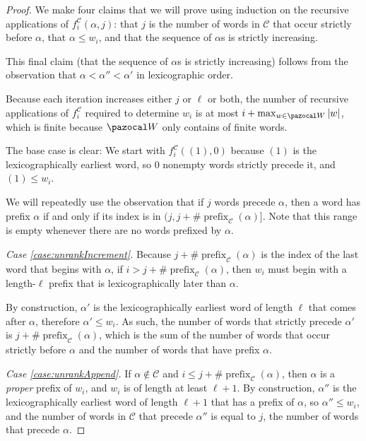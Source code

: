 \begin{proof}
  We make four claims that we will prove using
  induction on the recursive applications of $f_i^\mathcal{C}(\alpha, j)$:
  that $j$ is the number of words in $\mathcal{C}$ that occur strictly before $\alpha$,
  that $\alpha \leq w_i$,
  and that the sequence of $\alpha$s is strictly increasing.

  This final claim (that the sequence of $\alpha$s is strictly increasing)
  follows from the observation that ${\alpha < \alpha'' < \alpha'}$ in
  lexicographic order.

  Because each iteration increases either $j$ or $\ell$ or both,
  the number of recursive applications of $f_i^\mathcal{C}$ required to
  determine $w_i$ is at most $i + \max_{w \in \pazocal W} |w|$, which is
  finite because $\pazocal W$ only contains of finite words.

  The base case is clear: We start with $f_i^\mathcal{C}((1), 0)$ because
  $(1)$ is the lexicographically earliest word, so $0$ nonempty words strictly
  precede it, and $(1) \leq w_i$.

  We will repeatedly use the observation that if $j$ words precede $\alpha$,
  then a word has prefix $\alpha$ if and only if its index is in
  $(j, j + \#\operatorname{prefix}_\mathcal{C}(\alpha)]$. Note that this
  range is empty whenever there are no words prefixed by $\alpha$.

  \textit{Case \eqref{case:unrankIncrement}.}
  Because $j + \#\operatorname{prefix}_\mathcal{C}(\alpha)$ is the index
  of the last word that begins with $\alpha$,
  if $i > j + \#\operatorname{prefix}_\mathcal{C}(\alpha)$, then $w_i$ must
  begin with a length-$\ell$ prefix that is lexicographically later than $\alpha$.

  By construction, $\alpha'$ is the lexicographically earliest word of length
  $\ell$ that comes after $\alpha$, therefore $\alpha' \leq w_i$.
  As such, the number of words that strictly precede
  $\alpha'$ is ${j + \#\operatorname{prefix}_\mathcal{C}(\alpha)}$,
  which is the sum of the number of words that occur strictly before $\alpha$
  and the number of words that have prefix $\alpha$.

  \textit{Case \eqref{case:unrankAppend}.}
  If $\alpha \not\in \mathcal C$ and $i \leq j + \#\operatorname{prefix}_\mathcal{C}(\alpha)$,
  then $\alpha$ is a \textit{proper} prefix of $w_i$, and $w_i$ is of length at
  least $\ell + 1$.
  By construction, $\alpha''$ is the lexicographically earliest word of length
  $\ell + 1$ that has a prefix of $\alpha$,
  so $\alpha'' \leq w_i$,
  and the number of words in $\mathcal{C}$ that precede
  $\alpha''$ is equal to $j$, the number of words that precede $\alpha$.


\end{proof}
